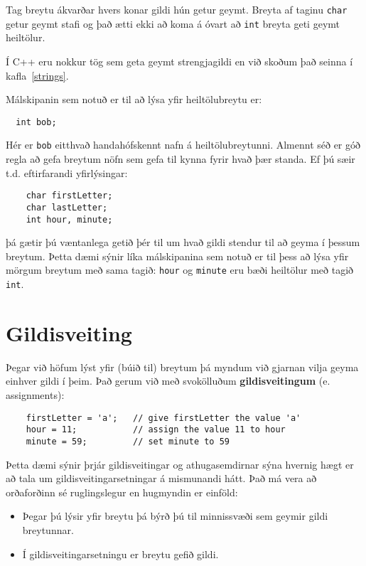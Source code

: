 Tag breytu ákvarðar hvers konar gildi hún getur geymt.
Breyta af taginu {\tt char} getur geymt stafi og það ætti ekki að koma á óvart að {\tt int} breyta geti geymt heiltölur.

Í C++ eru nokkur tög sem geta geymt strengjagildi en við skoðum það seinna í kafla~\ref{strings}.


Málskipanin sem notuð er til að lýsa yfir heiltölubreytu er: 

\begin{verbatim}
  int bob;
\end{verbatim}
%
Hér er {\tt bob} eitthvað handahófskennt nafn á heiltölubreytunni.
Almennt séð er góð regla að gefa breytum nöfn sem gefa til kynna fyrir hvað þær standa.
Ef þú sæir t.d. eftirfarandi yfirlýsingar: 

\begin{verbatim}
    char firstLetter;
    char lastLetter;
    int hour, minute;
\end{verbatim}
%
þá gætir þú væntanlega getið þér til um hvað gildi stendur til að geyma í þessum breytum.
Þetta dæmi sýnir líka málskipanina sem notuð er til þess að lýsa yfir mörgum breytum með sama tagið: {\tt hour} og {\tt minute}
eru bæði heiltölur með tagið {\tt int}.

\section{Gildisveiting}

Þegar við höfum lýst yfir (búið til) breytum þá myndum við gjarnan vilja geyma einhver gildi í þeim.
Það gerum við með svokölluðum {\bf gildisveitingum} (e. assignments):

\begin{verbatim}
    firstLetter = 'a';   // give firstLetter the value 'a'
    hour = 11;           // assign the value 11 to hour
    minute = 59;         // set minute to 59
\end{verbatim}
%
Þetta dæmi sýnir þrjár gildisveitingar og athugasemdirnar sýna hvernig hægt er að tala um gildisveitingarsetningar á mismunandi hátt.
Það má vera að orðaforðinn sé ruglingslegur en hugmyndin er einföld: 

\begin{itemize}
\item Þegar þú lýsir yfir breytu þá býrð þú til minnissvæði sem geymir gildi breytunnar.
\item Í gildisveitingarsetningu er breytu gefið gildi. 
\end{itemize}

